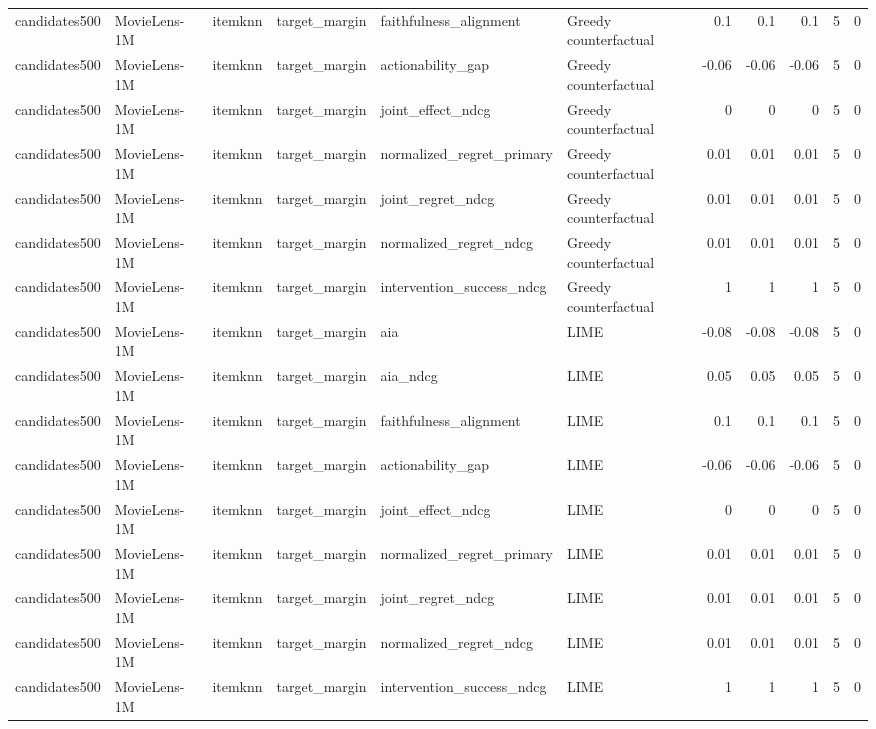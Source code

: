 \begin{table}[t]
{\begin{tabular}{llllllrrrrr}
candidates500 & MovieLens-1M & itemknn & target\_margin & faithfulness\_alignment & Greedy counterfactual & 0.1 & 0.1 & 0.1 & 5 & 0 \\
candidates500 & MovieLens-1M & itemknn & target\_margin & actionability\_gap & Greedy counterfactual & -0.06 & -0.06 & -0.06 & 5 & 0 \\
candidates500 & MovieLens-1M & itemknn & target\_margin & joint\_effect\_ndcg & Greedy counterfactual & 0 & 0 & 0 & 5 & 0 \\
candidates500 & MovieLens-1M & itemknn & target\_margin & normalized\_regret\_primary & Greedy counterfactual & 0.01 & 0.01 & 0.01 & 5 & 0 \\
candidates500 & MovieLens-1M & itemknn & target\_margin & joint\_regret\_ndcg & Greedy counterfactual & 0.01 & 0.01 & 0.01 & 5 & 0 \\
candidates500 & MovieLens-1M & itemknn & target\_margin & normalized\_regret\_ndcg & Greedy counterfactual & 0.01 & 0.01 & 0.01 & 5 & 0 \\
candidates500 & MovieLens-1M & itemknn & target\_margin & intervention\_success\_ndcg & Greedy counterfactual & 1 & 1 & 1 & 5 & 0 \\
candidates500 & MovieLens-1M & itemknn & target\_margin & aia & LIME & -0.08 & -0.08 & -0.08 & 5 & 0 \\
candidates500 & MovieLens-1M & itemknn & target\_margin & aia\_ndcg & LIME & 0.05 & 0.05 & 0.05 & 5 & 0 \\
candidates500 & MovieLens-1M & itemknn & target\_margin & faithfulness\_alignment & LIME & 0.1 & 0.1 & 0.1 & 5 & 0 \\
candidates500 & MovieLens-1M & itemknn & target\_margin & actionability\_gap & LIME & -0.06 & -0.06 & -0.06 & 5 & 0 \\
candidates500 & MovieLens-1M & itemknn & target\_margin & joint\_effect\_ndcg & LIME & 0 & 0 & 0 & 5 & 0 \\
candidates500 & MovieLens-1M & itemknn & target\_margin & normalized\_regret\_primary & LIME & 0.01 & 0.01 & 0.01 & 5 & 0 \\
candidates500 & MovieLens-1M & itemknn & target\_margin & joint\_regret\_ndcg & LIME & 0.01 & 0.01 & 0.01 & 5 & 0 \\
candidates500 & MovieLens-1M & itemknn & target\_margin & normalized\_regret\_ndcg & LIME & 0.01 & 0.01 & 0.01 & 5 & 0 \\
candidates500 & MovieLens-1M & itemknn & target\_margin & intervention\_success\_ndcg & LIME & 1 & 1 & 1 & 5 & 0 \\

\end{tabular}}
\end{table}

